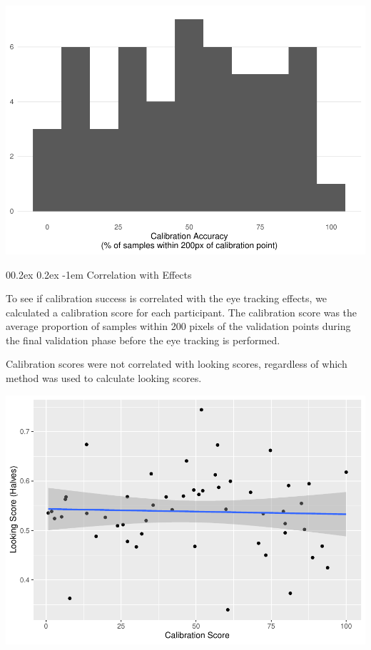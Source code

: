 \documentclass[
  man,floatsintext]{apa6}
\makeatletter
\let\oldparagraph\paragraph
\renewcommand{\paragraph}[1]{\oldparagraph{#1}\mbox{}}
\renewcommand{\paragraph}{\@startsection{paragraph}{4}{\parindent}%
  {0\baselineskip \@plus 0.2ex \@minus 0.2ex}%
  {-1em}%
  {\normalfont\normalsize\bfseries\itshape\typesectitle}}
\makeatother
\begin{document}
\includegraphics{manuscript_files/figure-latex/E3-cal Plot Calibration Accuracy-1.pdf}

\hypertarget{correlation-with-effects}{%
\paragraph{Correlation with Effects}\label{correlation-with-effects}}

To see if calibration success is correlated with the eye tracking effects, we calculated a calibration score for each participant. The calibration score was the average proportion of samples within 200 pixels of the validation points during the final validation phase before the eye tracking is performed.

Calibration scores were not correlated with looking scores, regardless of which method was used to calculate looking scores.

\includegraphics{manuscript_files/figure-latex/E3-cal Plot looking score (halves) by calibration-1.pdf}
\end{document}
